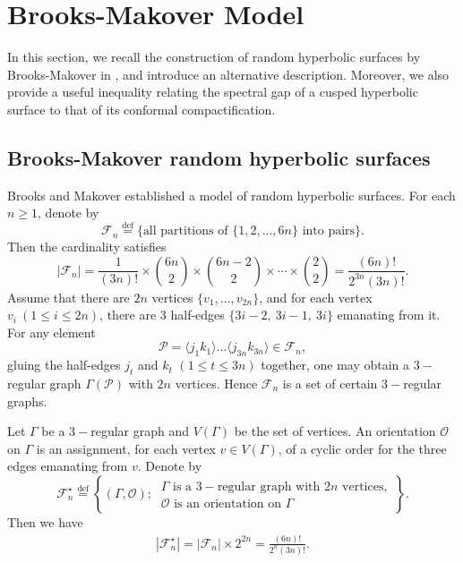 \documentclass{amsart}
\theoremstyle{plain}
\theoremstyle{definition}
\theoremstyle{remark}
\begin{document}
 \tableofcontents


 \section{Brooks-Makover Model}\label{s-bm}
In this section, we recall the construction of random hyperbolic surfaces by Brooks-Makover in \cite{BM04}, and introduce an alternative description. Moreover, we also provide a useful inequality relating the spectral gap of a cusped hyperbolic surface to that of its conformal compactification. 
\subsection{Brooks-Makover random hyperbolic surfaces}
Brooks and Makover \cite{BM04} established a model of random hyperbolic surfaces. For each $n\geq 1$, denote by
$$\mathcal{F}_n\overset{\mathrm{def}}{=}\{\text{all partitions of }\{1,2,...,6n\}\text{ into pairs} \}.$$
Then the cardinality satisfies $$|\mathcal{F}_n|=    \frac{1}{(3n)!}\times\binom{6n}{2}\times\binom{6n-2}{2}\times\cdots\times\binom{2}{2}=\frac{(6n)!}{2^{3n}(3n)!}.$$
Assume that there are $2n$ vertices $\{v_1,...,v_{2n}\}$, and for each vertex $v_i\ (1\leq i\leq 2n)$, there are $3$ half-edges $\{3i-2,\ 3i-1,\ 3i\}$ emanating from it. For any element 
 $$\mathcal{P}=\langle j_1k_1\rangle...\langle j_{3n}k_{3n}\rangle\in\mathcal{F}_n,$$
 gluing the half-edges $j_t$ and $k_t$ $(1\leq t\leq 3n)$ together, one may obtain a $3-$regular graph $\Gamma(\mathcal{P})$ with $2n$ vertices. Hence $\mathcal{F}_n$ is a set of certain $3-$regular graphs. 
 
 Let $\Gamma$ be a $3-$regular graph and $V(\Gamma)$ be the set of vertices. An orientation $\mathcal{O}$ on $\Gamma$ is an assignment, for each vertex $v\in V(\Gamma)$, of a cyclic order for the three edges emanating from $v$. Denote by 
 \[\mathcal{F}_n^\star\overset{\mathrm{def}}{=}\left\{(\Gamma,\mathcal{O});\ \begin{matrix}\Gamma \text{ is a $3-$regular graph with $2n$ vertices},\\
 \mathcal{O} \text{ is an orientation on }\Gamma 
 \end{matrix}\right\}.\]
 Then we have
 \begin{align}\label{e-num}
     |\mathcal{F}_n^\star|=|\mathcal{F}_n|\times2^{2n}=\frac{(6n)!}{2^{n}(3n)!}.
 \end{align}
\end{document}
